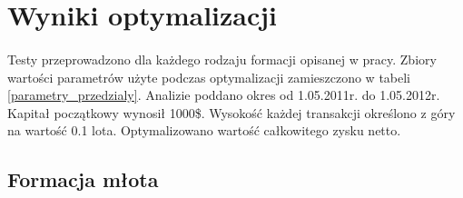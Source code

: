 \documentclass[pdflatex,11pt]{aghdpl}
\begin{document}
\section{Wyniki optymalizacji}
\label{sec:wyniki_optymalizacji}
\paragraph{}
Testy przeprowadzono dla każdego rodzaju formacji opisanej w pracy. Zbiory wartości parametrów użyte podczas optymalizacji zamieszczono w tabeli \ref{parametry_przedzialy}. Analizie poddano okres od 1.05.2011r. do 1.05.2012r. Kapitał początkowy wynosił 1000\$. Wysokość każdej transakcji określono z góry na wartość 0.1 lota. Optymalizowano wartość całkowitego zysku netto.

\subsection{Formacja młota}
\paragraph{}
\end{document}
